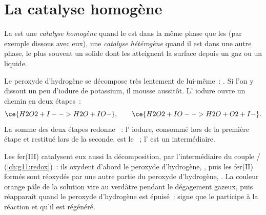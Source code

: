 \section{La catalyse homogène}

\begin{definition}\label{def:g12:catalysis:homogeneous}
La  est une \emph{catalyse homogène}
quand le  est dans la même phase que les  (par exemple
dissous avec eux), une \emph{catalyse hétérogène}
quand il est dans une autre phase, le plus souvent un solide dont les
 atteignent la surface depuis un gaz ou un liquide.
\end{definition}

\begin{example}\label{ex:g12:catalysis:iodide}
Le peroxyde d'hydrogène se décompose très lentement de lui-même~:
. Si l'on y dissout un peu d'iodure de potassium,
il mousse aussitôt. L' iodure ouvre un chemin en deux étapes~:
\[
  \ce{H2O2 + I- -> H2O + IO-}, \qquad
  \ce{H2O2 + IO- -> H2O + O2 + I-} .
\]
La somme des deux étapes redonne ~: l'
iodure, consommé lors de la première étape et restitué lors de la
seconde, est le ~; l'  est un intermédiaire.
\end{example}


\begin{example}\label{ex:g12:catalysis:iron}
Les  fer(III) catalysent eux aussi la décomposition, par
l'intermédiaire du couple / (\cref{ch:g11:redox})~:
ils oxydent d'abord le peroxyde d'hydrogène,
, puis les  fer(II)
formés sont réoxydés par une autre partie du peroxyde d'hydrogène,
. La couleur orange pâle
de la solution vire au verdâtre pendant le dégagement gazeux, puis
réapparaît quand le peroxyde d'hydrogène est épuisé~: signe que le
 participe à la réaction et qu'il est régénéré.
\end{example}

